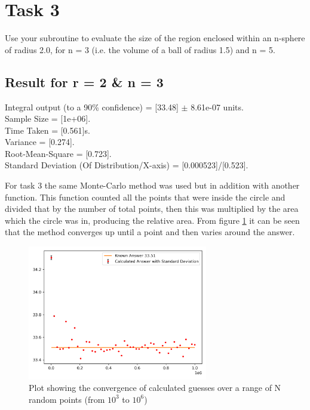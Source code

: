 \documentclass[12pt, A4]{article}
\begin{document}
\section{Task 3} %
\label{sec:Task 3}

Use your subroutine to evaluate the size of the region enclosed
within an n-sphere of radius 2.0, for n = 3 (i.e. the volume of a ball of
radius 1.5) and n = 5.

\subsection{Result for r = 2 \& n = 3} %
\label{sub:Result for r = 2}


Integral output (to a 90\% confidence) = [33.48] $\pm$  8.61e-07 units.
\\
Sample Size = [1e+06].
\\
Time Taken = [0.561]s.
\\
Variance = [0.274].
\\
Root-Mean-Square = [0.723].
\\
Standard Deviation (Of Distribution/X-axis) = [0.000523]/[0.523].

\vspace{1em}

For task 3 the same Monte-Carlo method was used but in addition with another
function. This function counted all the points that were inside the circle and divided that by 
the number of total points, then this was multiplied by the area which the circle 
was in, producing the relative area. From figure \ref{fig:task_3_n3} it can be seen that 
the method converges up until a point and then varies around the answer.

\begin{figure}[H]
  \begin{center}
    \includegraphics[width=0.7\textwidth]{task_3_n3.png}
  \end{center}
  \caption{Plot showing the convergence of calculated guesses over a range of N random points (from $10^3$ to $10^6$)}
  \label{fig:task_3_n3}
\end{figure}
\end{document}
